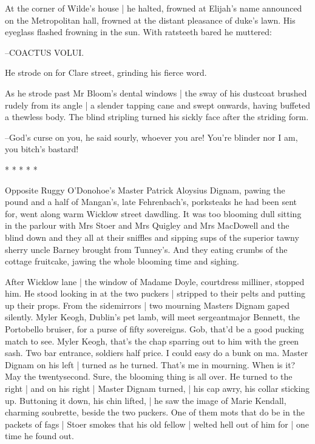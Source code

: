 At the corner of Wilde's house |
he halted, frowned at Elijah's name announced on the Metropolitan hall,
frowned at the distant pleasance of duke's lawn.
His eyeglass flashed frowning in the sun.
With ratsteeth bared he muttered:

--COACTUS VOLUI.

He strode on for Clare street, grinding his fierce word.

As he strode past Mr Bloom's dental windows |
the sway of his dustcoat brushed rudely from its angle |
a slender tapping cane and swept onwards,
having buffeted a thewless body.
The blind stripling turned his sickly face after the striding form.

--God's curse on you,
he said sourly,
whoever you are!
You're blinder nor I am,
you bitch's bastard!


    * * * * *


Opposite Ruggy O'Donohoe's Master Patrick Aloysius Dignam,
pawing the pound and a half of Mangan's, late Fehrenbach's, porksteaks he
had been sent for, went along warm Wicklow street dawdling. It was too
blooming dull sitting in the parlour with Mrs Stoer and Mrs Quigley and
Mrs MacDowell and the blind down and they all at their sniffles and
sipping sups of the superior tawny sherry uncle Barney brought from
Tunney's. And they eating crumbs of the cottage fruitcake, jawing the
whole blooming time and sighing.

After Wicklow lane |
the window of Madame Doyle, courtdress milliner,
stopped him.
He stood looking in at the two puckers |
stripped to their pelts and putting up their props.
From the sidemirrors |
two mourning Masters Dignam gaped silently.
Myler Keogh, Dublin's pet lamb,
will meet sergeantmajor Bennett, the Portobello bruiser,
for a purse of fifty sovereigns.
Gob, that'd be a good pucking match to see.
Myler Keogh, that's the chap sparring out to him with the green sash.
Two bar entrance, soldiers half price.
I could easy do a bunk on ma.
Master Dignam on his left |
turned as he turned.
That's me in mourning.
When is it?
May the twentysecond.
Sure, the blooming thing is all over.
He turned to the right |
and on his right |
Master Dignam turned, |
his cap awry, his collar sticking up.
Buttoning it down, his chin lifted, |
he saw the image of Marie Kendall, charming soubrette,
beside the two puckers.
One of them mots that do be in the packets of fags |
Stoer smokes that his old fellow |
welted hell out of him for |
one time he found out.

